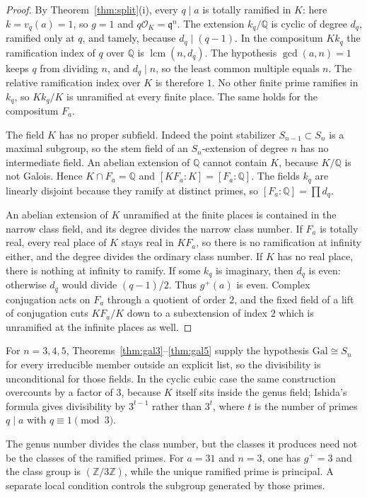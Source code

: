 \documentclass[11pt]{article}
\theoremstyle{definition}
\theoremstyle{remark}
\newcommand{\Z}{\mathbb{Z}}
\newcommand{\Q}{\mathbb{Q}}
\newcommand{\OK}{\mathcal{O}_K}
\newcommand{\Gal}{\mathrm{Gal}}
\begin{document}
\begin{proof}
By Theorem~\ref{thm:split}(i), every $q\mid a$ is totally ramified in $K$: here
$k=v_q(a)=1$, so $g=1$ and $q\OK=\mathfrak{q}^{n}$. The extension $k_q/\Q$ is
cyclic of degree $d_q$, ramified only at $q$, and tamely, because $d_q\mid(q-1)$.
In the compositum $Kk_q$ the ramification index of $q$ over $\Q$ is
$\operatorname{lcm}(n,d_q)$. The hypothesis $\gcd(a,n)=1$ keeps $q$ from dividing
$n$, and $d_q\mid n$, so the least common multiple equals $n$. The relative
ramification index over $K$ is therefore $1$. No other finite prime ramifies in
$k_q$, so $Kk_q/K$ is unramified at every finite place. The same holds for the
compositum $F_a$.

The field $K$ has no proper subfield. Indeed the point stabilizer $S_{n-1}\subset S_n$
is a maximal subgroup, so the stem field of an $S_n$-extension of degree $n$ has
no intermediate field. An abelian extension of $\Q$ cannot contain $K$, because
$K/\Q$ is not Galois. Hence $K\cap F_a=\Q$ and $[KF_a:K]=[F_a:\Q]$. The fields
$k_q$ are linearly disjoint because they ramify at distinct primes, so
$[F_a:\Q]=\prod d_q$.

An abelian extension of $K$ unramified at the finite places is contained in the
narrow class field, and its degree divides the narrow class number. If $F_a$ is
totally real, every real place of $K$ stays real in $KF_a$, so there is no
ramification at infinity either, and the degree divides the ordinary class
number. If $K$ has no real place, there is nothing at infinity to ramify. If some
$k_q$ is imaginary, then $d_q$ is even: otherwise $d_q$ would divide $(q-1)/2$.
Thus $g^{+}(a)$ is even. Complex conjugation acts on $F_a$ through a quotient of
order $2$, and the fixed field of a lift of conjugation cuts $KF_a/K$ down to a
subextension of index $2$ which is unramified at the infinite places as well.
\end{proof}

For $n=3,4,5$, Theorems~\ref{thm:gal3}--\ref{thm:gal5} supply the hypothesis
$\Gal\cong S_n$ for every irreducible member outside an explicit list, so the
divisibility is unconditional for those fields. In the cyclic cubic case the
same construction overcounts by a factor of $3$, because $K$ itself sits inside
the genus field; Ishida's formula \cite{Ish75} gives divisibility by $3^{t-1}$
rather than $3^{t}$, where $t$ is the number of primes $q\mid a$ with $q\equiv 1\pmod 3$.

The genus number divides the class number, but the classes it produces need not
be the classes of the ramified primes. For $a=31$ and $n=3$, one has $g^{+}=3$
and the class group is $(\Z/3\Z)$, while the unique ramified prime is principal.
A separate local condition controls the subgroup generated by those primes.
\end{document}

